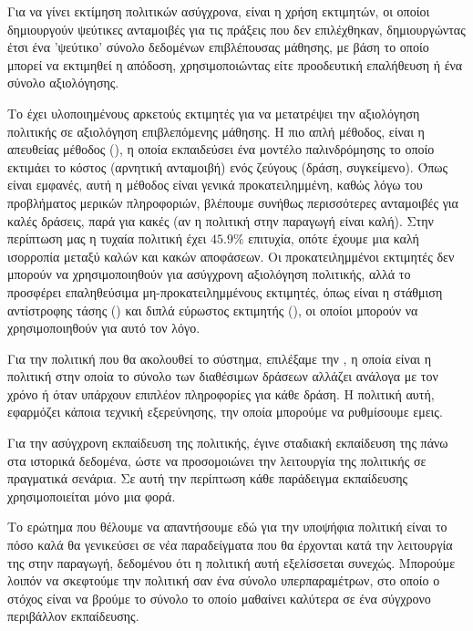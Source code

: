 Για να γίνει εκτίμηση πολιτικών  ασύγχρονα, είναι η χρήση εκτιμητών, οι οποίοι δημιουργούν ψεύτικες ανταμοιβές για τις πράξεις που δεν επιλέχθηκαν, δημιουργώντας έτσι ένα 'ψεύτικο' σύνολο δεδομένων επιβλέπουσας μάθησης, με βάση το οποίο μπορεί να εκτιμηθεί η απόδοση, χρησιμοποιώντας είτε προοδευτική επαλήθευση ή ένα σύνολο αξιολόγησης.

Το   έχει υλοποιημένους αρκετούς εκτιμητές για να μετατρέψει την αξιολόγηση πολιτικής σε αξιολόγηση επιβλεπόμενης μάθησης. Η πιο απλή μέθοδος, είναι η απευθείας μέθοδος (), η οποία εκπαιδεύσει ένα μοντέλο παλινδρόμησης το οποίο εκτιμάει το κόστος (αρνητική ανταμοιβή) ενός ζεύγους (δράση, συγκείμενο). Όπως είναι εμφανές, αυτή η μέθοδος είναι γενικά προκατειλημμένη, καθώς λόγω του προβλήματος μερικών πληροφοριών, βλέπουμε συνήθως περισσότερες ανταμοιβές για καλές δράσεις, παρά για κακές (αν η πολιτική στην παραγωγή είναι καλή). Στην περίπτωση μας η τυχαία πολιτική έχει $45.9\%$ επιτυχία, οπότε έχουμε μια καλή ισορροπία μεταξύ καλών και κακών αποφάσεων. Οι προκατειλημμένοι εκτιμητές δεν μπορούν να χρησιμοποιηθούν για ασύγχρονη αξιολόγηση πολιτικής, αλλά το  προσφέρει επαληθεύσιμα μη-προκατειλημμένους εκτιμητές, όπως είναι η στάθμιση αντίστροφης τάσης () και διπλά εύρωστος εκτιμητής (),  οι οποίοι μπορούν να χρησιμοποιηθούν για αυτό τον λόγο.

Για την πολιτική που θα ακολουθεί το σύστημα, επιλέξαμε την , η οποία είναι
η πολιτική στην οποία το σύνολο των διαθέσιμων δράσεων αλλάζει ανάλογα με τον χρόνο ή όταν υπάρχουν επιπλέον πληροφορίες για κάθε δράση. Η πολιτική αυτή, εφαρμόζει κάποια τεχνική εξερεύνησης, την οποία μπορούμε να ρυθμίσουμε εμεις.

Για την ασύγχρονη εκπαίδευση της πολιτικής, έγινε σταδιακή εκπαίδευση της πάνω στα ιστορικά δεδομένα, ώστε να προσομοιώνει την λειτουργία της πολιτικής σε πραγματικά σενάρια. Σε αυτή την περίπτωση κάθε παράδειγμα εκπαίδευσης χρησιμοποιείται μόνο μια φορά.

Το ερώτημα που θέλουμε να απαντήσουμε εδώ για την υποψήφια πολιτική είναι το πόσο καλά θα γενικεύσει σε νέα παραδείγματα που θα έρχονται κατά την λειτουργία της στην παραγωγή, δεδομένου ότι η πολιτική αυτή εξελίσσεται συνεχώς. Μπορούμε λοιπόν να σκεφτούμε την πολιτική σαν ένα σύνολο υπερπαραμέτρων, στο οποίο ο στόχος είναι να βρούμε το σύνολο το οποίο μαθαίνει καλύτερα σε ένα σύγχρονο περιβάλλον εκπαίδευσης.

